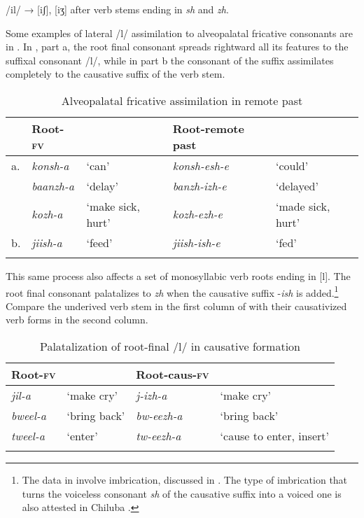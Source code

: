 \documentclass[output=paper]{langsci/langscibook}
\begin{document}
\ea
\label{ex:3.kawasha}
/il/ → [iʃ], [iʒ] after verb stems ending in \textit{sh} and \textit{zh}.
\z

Some examples of lateral /l/ assimilation to alveopalatal fricative consonants are in . In , part a, the root final consonant spreads rightward all its features to the suffixal consonant /l/, while in part b the consonant of the suffix assimilates completely to the causative suffix of the verb stem. 

\begin{table}
\begin{tabularx}{\textwidth}{llllX}
\lsptoprule
 & Root-\textsc{fv} &  & Root-remote past & \\
\midrule
a. & \textit{konsh-a} & `can' & \textit{konsh-esh-e} & `could' \\
 & \textit{baanzh-a} & `delay' & \textit{banzh-izh-e} & `delayed' \\
 & \textit{kozh-a} & `make sick, hurt' & \textit{kozh-ezh-e} & `made sick, hurt' \\
\tablevspace
b. & \textit{jiish-a} & `feed' & \textit{jiish-ish-e} & `fed' \\
\lspbottomrule
\end{tabularx}

\caption{Alveopalatal fricative assimilation in remote past}
\label{tab:5.kawasha}

\end{table}


This same process also affects a set of monosyllabic verb roots ending in [l]. The root final consonant palatalizes to \textit{zh} when the causative suffix -\textit{ish} is added.\footnote{The data in  involve imbrication, discussed in . The type of imbrication that turns the voiceless consonant \textit{sh} of the causative suffix into a voiced one is also attested in Chiluba \citep[73]{lukusa1993}.} Compare the underived verb stem in the first column of  with their causativized verb forms in the second column.

\begin{table}
\begin{tabularx}{\textwidth}{XXXl}
\lsptoprule
  Root-\textsc{fv} &  &   Root-caus-\textsc{fv} & \\
\midrule
\textit{jil-a} & `make cry' & \textit{j-izh-a} & `make cry' \\
\textit{bweel-a} & `bring back' & \textit{bw-eezh-a} & `bring back' \\
\textit{tweel-a} & `enter' & \textit{tw-eezh-a} & `cause to enter, insert' \\

\lspbottomrule
\end{tabularx}

\caption{Palatalization of root-final /l/ in causative formation}
\label{tab:6.kawasha}

 \end{table}
\end{document}
